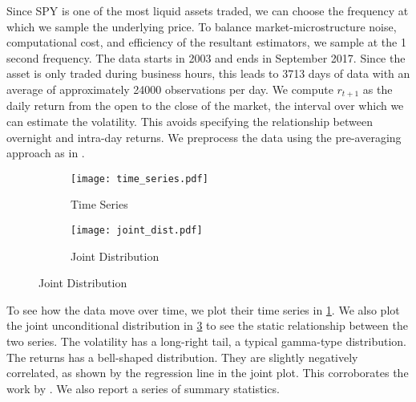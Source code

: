 \documentclass[11pt, letterpaper, twoside]{article}
\begin{document}
Since SPY is one of the most liquid assets traded, we can choose the frequency at which we sample the underlying price. To balance market-microstructure noise, computational cost, and efficiency of the resultant estimators, we sample at the \num{1} second frequency. The data starts in 2003 and ends in September 2017. Since the asset is only traded during business hours, this leads to \num{3713} days of data with an average of approximately \num{24000} observations per day. We compute $r_{t+1}$ as the daily return from the open to the close of the market, the interval over which we can estimate the volatility. This avoids specifying the relationship between overnight and intra-day returns. We preprocess the data using the pre-averaging approach as in \textcites{podolskij2009bipower, aitsahalia2012testing}. 


\begin{figure}[htb]

  \centering
  \caption{S\&P 500 Volatility and Log-Return}


  \begin{subfigure}[t]{.54\textwidth}
    \label{fig:spy_dynamics}
    \caption{Time Series}
    \texttt{[image: time\_series.pdf]}
  \end{subfigure}%
%
  \hfill
%
  \begin{subfigure}[t]{.44\textwidth}
    \label{fig:spy_static}
    \caption{Joint Distribution}
    \texttt{[image: joint\_dist.pdf]}
  \end{subfigure}
\end{figure}


To see how the data move over time, we plot their time series in  \cref{fig:spy_dynamics}.  We also plot the joint unconditional distribution in \cref{fig:spy_static} to see the static relationship between the two series. The volatility has a long-right tail, a typical gamma-type distribution. The returns has a bell-shaped distribution. They are slightly negatively correlated, as shown by the regression line in the joint plot. This corroborates the work by \textcites{bandi2012timevarying, aitsahalia2013leverage}. We also report a series of summary statistics.
\end{document}

